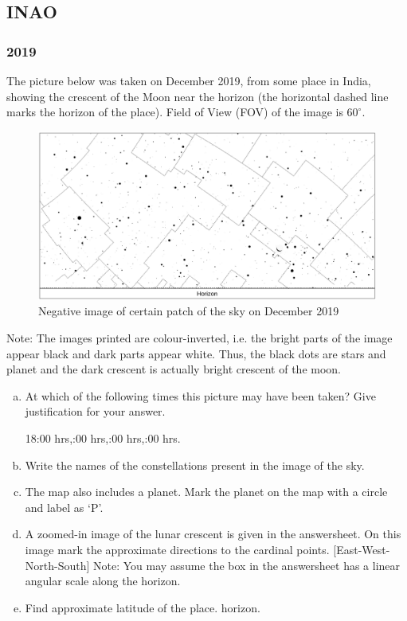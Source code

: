 \documentclass[a4paper,12pt]{extarticle}
\begin{document}
\subsection{INAO}

\subsubsection{2019}

The picture below was taken on  December 2019, from some place in India, showing the crescent of the Moon near the horizon (the horizontal dashed line marks the horizon of the place). Field of View (FOV) of the image is $60^\circ$.
\begin{figure}[H]
    \centering
    \includegraphics[width=0.9\linewidth]{INAO_19.png}
    \caption{Negative image of certain patch of the sky on  December 2019}
\end{figure}
Note: The images printed are colour-inverted, i.e. the bright parts of the image appear black and dark parts appear white. Thus, the black dots are stars and planet and the dark crescent is actually bright crescent of the moon.
\begin{enumerate}[a.]
    \item At which of the following times this picture may have been taken? Give justification for your answer.
    \begin{center}
    18:00 hrs,:00 hrs,:00 hrs,:00 hrs. 
    \end{center}
    \item Write the names of the constellations present in the image of the sky.
    \item The map also includes a planet. Mark the planet on the map with a circle and label as `P'.
    \item A zoomed-in image of the lunar crescent is given in the answersheet. On this image mark the approximate directions to the cardinal points. [East-West-North-South] Note: You may assume the box in the answersheet has a linear angular scale along the horizon.
    \item Find approximate latitude of the place.
horizon.
\end{enumerate}
\end{document}
